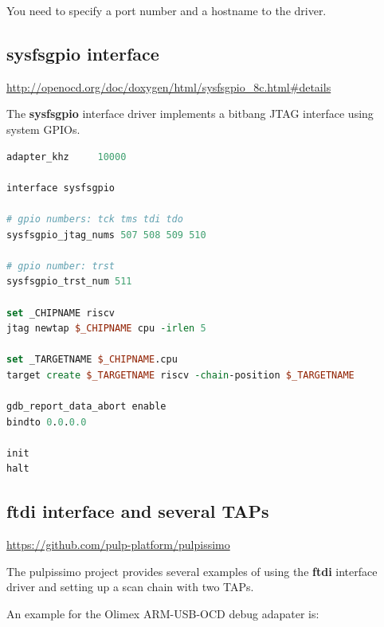 \documentclass{article}
\begin{document}
    You need to specify a port number and a hostname to the driver.
    
    \subsection{sysfsgpio interface}
    
    \url{http://openocd.org/doc/doxygen/html/sysfsgpio_8c.html#details}
    
    The \textbf{sysfsgpio} interface driver implements a bitbang JTAG interface using system GPIOs.
    
    \begin{lstlisting}[language=tcl]
adapter_khz		10000

interface sysfsgpio

# gpio numbers: tck tms tdi tdo
sysfsgpio_jtag_nums 507 508 509 510

# gpio number: trst
sysfsgpio_trst_num 511 

set _CHIPNAME riscv
jtag newtap $_CHIPNAME cpu -irlen 5

set _TARGETNAME $_CHIPNAME.cpu
target create $_TARGETNAME riscv -chain-position $_TARGETNAME

gdb_report_data_abort enable
bindto 0.0.0.0

init
halt
    \end{lstlisting}
    
    \newpage
    \subsection{ftdi interface and several TAPs}
    
    \url{https://github.com/pulp-platform/pulpissimo}
    
    The pulpissimo project provides several examples of using the \textbf{ftdi} interface driver and setting up a scan chain with two TAPs.
      
    An example for the Olimex ARM-USB-OCD debug adapater is:
    
\end{document}
